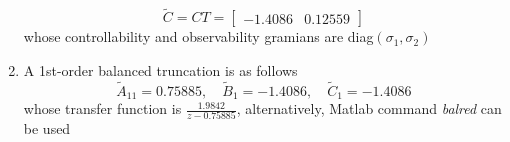 \documentclass[10pt,a4paper,oneside]{article}
\begin{document}
\begin{enumerate}
\[
\tilde{C}=C T =\left[\begin{array}{cc}{-1.4086} & {0.12559}\end{array}\right] 
\]
whose controllability and observability gramians are diag$(\sigma_{1},\sigma_{2})$
\item A 1st-order balanced truncation is as follows
\[
\tilde{A}_{11}=0.75885, \quad \tilde{B}_{1}=-1.4086, \quad \tilde{C}_{1}=-1.4086
\]
whose transfer function is $\frac{1.9842}{z-0.75885}$, alternatively, Matlab command \textit{balred} can be used
\end{enumerate}
\end{document}
